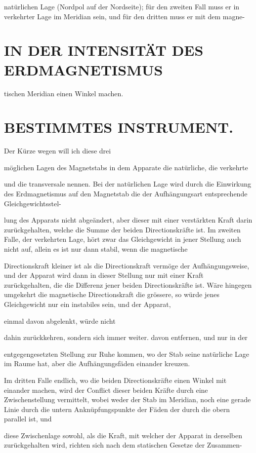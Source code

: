 \documentclass[12pt,a4paper]{article}
\begin{document}
natürlichen Lage (Nordpol auf der Nordseite); für den zweiten Fall muss er in verkehrter Lage im Meridian sein, und für den dritten muss er mit dem magne-

\section*{IN DER INTENSITÄT DES ERDMAGNETISMUS}
tischen Meridian einen Winkel machen.

\section*{BESTIMMTES INSTRUMENT.}
Der Kürze wegen will ich diese drei

möglichen Lagen des Magnetstabs in dem Apparate die natürliche, die verkehrte

und die transversale nennen. Bei der natürlichen Lage wird durch die Einwirkung des Erdmagnetismus auf den Magnetstab die der Aufhängungsart entsprechende Gleichgewichtsstel-

lung des Apparats nicht abgeändert, aber dieser mit einer verstärkten Kraft darin zurückgehalten, welche die Summe der beiden Directionskräfte ist. Im zweiten Falle, der verkehrten Lage, hört zwar das Gleichgewicht in jener Stellung auch nicht auf, allein es ist nur dann stabil, wenn die magnetische

Directionskraft kleiner ist als die Directionskraft vermöge der Aufhängungsweise, und der Apparat wird dann in dieser Stellung nur mit einer Kraft zurückgehalten, die die Differenz jener beiden Directionskräfte ist. Wäre hingegen umgekehrt die magnetische Directionskraft die grössere, so würde jenes Gleichgewicht nur ein instabiles sein, und der Apparat,

einmal davon abgelenkt, würde nicht

dahin zurückkehren, sondern sich immer weiter. davon entfernen, und nur in der

entgegengesetzten Stellung zur Ruhe kommen, wo der Stab seine natürliche Lage im Raume hat, aber die Aufhängungsfäden einander kreuzen.

Im dritten Falle endlich, wo die beiden Directionskräfte einen Winkel mit einander machen, wird der Conflict dieser beiden Kräfte durch eine Zwischenstellung vermittelt, wobei weder der Stab im Meridian, noch eine gerade Linie durch die untern Anknüpfungspunkte der Fäden der durch die obern parallel ist, und

diese Zwischenlage sowohl, als die Kraft, mit welcher der Apparat in derselben zurückgehalten wird, richten sich nach dem statischen Gesetze der Zusammen-
\end{document}
